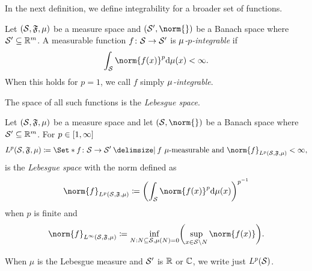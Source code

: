 In the next definition, we define integrability for a broader set of functions.
\begin{definition}[Integrability]%
	\label{def:integrability}
	Let \( (\mathcal{S}, \mathfrak{F}, \mu) \) be a measure space and \( (\ASet^\prime,\allowbreak \norm{}) \) be a Banach space where \( \mathcal{S}^\prime \subseteq \mathbb{R}^m \).
	A measurable function \( f \colon \mathcal{S} \to \mathcal{S}^\prime \) is \emph{\( \mu \)-\( p \)-integrable} if
	\begin{equation}
		\int_{\ASet} \norm{f(x)}^p \mathrm{d}\Measure(x) < \infty.
	\end{equation}
	When this holds for \( p = 1 \), we call \( f \) simply \emph{\( \mu \)-integrable}.
\end{definition}
The space of all such functions is the \emph{Lebesgue space}.
\begin{definition}%
	\label{def:lebesgue space}
	Let \( (\mathcal{S}, \mathfrak{F}, \mu) \) be a measure space and let \( (\ASet, \norm{}) \) be a Banach space where \( \mathcal{S}^\prime \subseteq \mathbb{R}^m \).
	For \( p \in \interval{1}{\infty} \)
	\begin{equation}
		\LebesgueSpace^p\MeasureSpace\coloneqq\Set*{\map{f}{\ASet}{\ASet^\prime} \given f\ \text{\(\Measure\)-measurable and } \norm{f}_{\LebesgueSpace^p\MeasureSpace}< \infty},
	\end{equation}
	is the \emph{Lebesgue space} with the norm defined as
	\begin{equation}
		\norm{f}_{\LebesgueSpace^p\MeasureSpace} \coloneqq \biggl( \int_{\ASet} \norm{f(x)}^p \mathrm{d}\Measure(x) \biggr)^{p^{-1}}
	\end{equation}
	when \( p \) is finite and
	\begin{equation}
		\norm{f}_{\LebesgueSpace^\infty\MeasureSpace} \coloneqq \inf_{N:N\subseteq\ASet, \Measure(N) = \num{0}}\biggl( \sup_{x\in\ASet\setminus N} \norm{f(x)} \biggr).
	\end{equation}
\end{definition}
When \( \mu \) is the Lebesgue measure and \( \mathcal{S}^\prime \) is \( \mathbb{R} \) or \( \mathbb{C} \), we write just \( L^p(\mathcal{S}) \).

